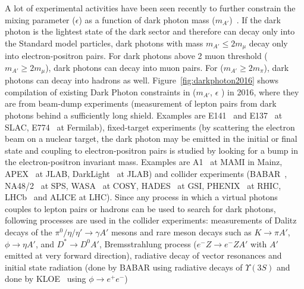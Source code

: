 \documentclass[../report.tex]{subfiles}
\begin{document}


A lot of experimental activities have been seen recently to further constrain 
the mixing parameter ($\epsilon$) as a function of 
dark photon mass ($m_{A'}$)~\cite{Alexander:2016aln}.
If the dark photon is the lightest state of the dark sector 
and therefore can decay only into the Standard model particles, dark photons with
mass $m_{A'} \le 2m_{\mu}$ decay only into electron-positron pairs. 
For dark photons above 2 muon threshold ($m_{A'} \ge 2m_{\mu}$), 
dark photons can decay into muon pairs. For ($m_{A'} \ge 2m_{\pi}$), 
dark photons can decay into hadrons as well. 
Figure~\ref{fig:darkphoton2016} shows compilation of existing Dark Photon constraints in ($m_{A'}$, $\epsilon$ ) in 2016, where they are from 
beam-dump experiments (measurement of lepton pairs from dark photons 
behind a sufficiently long shield. 
Examples are E141~\cite{Riordan:1987aw} and E137~\cite{Bjorken:1988as}
at SLAC, E774~\cite{Bross:1989mp} at Fermilab), 
fixed-target experiments (by scattering the electron beam on a nuclear target, 
the dark photon may be emitted in the initial or final state and coupling to 
electron-positron pairs is studied by looking for a bump in the 
electron-positron invariant mass. Examples are A1~\cite{Merkel:2014avp} 
at MAMI in Mainz, APEX~\cite{Abrahamyan:2011gv} at JLAB, 
DarkLight~\cite{Balewski:2013oza} at JLAB)
and collider experiments (BABAR~\cite{Lees:2014xha}, 
NA48/2~\cite{Batley:2015lha} at SPS, WASA~\cite{Moskal:2014dsa} at COSY, 
HADES~\cite{Agakishiev:2013fwl} at GSI, 
PHENIX~\cite{Adare:2014mgk} at RHIC, LHCb~\cite{Aaij:2017rft} and ALICE at LHC).
Since any process in which a virtual photons couples to lepton pairs or hadrons 
can be used to search for dark photons, 
following processes are used in the collider experiments: measurements of Dalitz decays of the $\pi^0/\eta/\eta' \rightarrow \gamma A'$ mesons and rare meson decays such as $K\rightarrow \pi A'$, $\phi \rightarrow \eta A'$, 
and $D^{*} \rightarrow D^{0}A'$,
Bremsstrahlung process 
($e^{-}Z \rightarrow e^{-}ZA'$ with $A'$ emitted at very forward direction),  
radiative decay of vector resonances and initial state radiation 
(done by BABAR using radiative decays of $\Upsilon(3S)$ and 
done by KLOE~\cite{Archilli:2011zc} using $\phi \rightarrow e^+e^-$)
\end{document}
